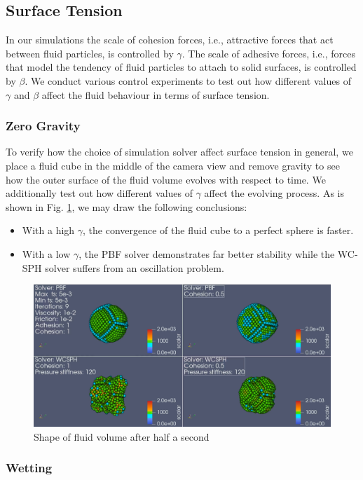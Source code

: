 \documentclass[
	11pt, 
	DIV10,
	ngerman,
	a4paper, 
	oneside, 
	headings=normal, 
	captions=tableheading,
	final, 
	numbers=noenddot
]{scrartcl}
\begin{document}
\subsection{Surface Tension}

In our simulations the scale of cohesion forces, i.e., attractive forces that act between fluid particles, is controlled by $ \gamma $. The scale of adhesive forces, i.e., forces that model the tendency of fluid particles to attach to solid surfaces, is controlled by $ \beta $. We conduct various control experiments to test out how different values of $ \gamma $ and $ \beta $ affect the fluid behaviour in terms of surface tension.

\subsubsection{Zero Gravity}

To verify how the choice of simulation solver affect surface tension in general, we place a fluid cube in the middle of the camera view and remove gravity to see how the outer surface of the fluid volume evolves with respect to time. We additionally test out how different values of $ \gamma $ affect the evolving process. As is shown in Fig. \ref{fig:no_gravity}, we may draw the following conclusions:

\begin{itemize}
    \item With a high $ \gamma $, the convergence of the fluid cube to a perfect sphere is faster.
    \item With a low $ \gamma $, the PBF solver demonstrates far better stability while the WC-SPH solver suffers from an oscillation problem.
\end{itemize}

\begin{figure}
    \centering
    \includegraphics[width=.6\textwidth]{pics/surface_tension.png}
    \caption{Shape of fluid volume after half a second}
    \label{fig:no_gravity}
\end{figure}

\subsubsection{Wetting}
\end{document}
